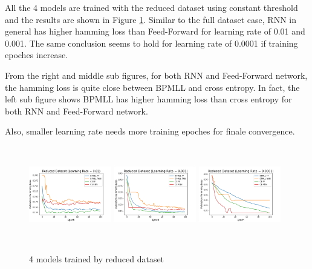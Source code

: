 \documentclass[11pt]{article}
\begin{document}
All the 4 models are trained with the reduced dataset using constant threshold and the results are shown in Figure \ref{fig:example2}. Similar to the full dataset case, RNN in general has higher hamming loss than Feed-Forward for learning rate of 0.01 and 0.001. The same conclusion seems to hold for learning rate of 0.0001 if training epoches increase. 

From the right and middle sub figures, for both RNN and Feed-Forward network, the hamming loss is quite close between BPMLL and cross entropy. In fact, the left sub figure shows BPMLL has higher hamming loss than cross entropy for both RNN and Feed-Forward network.

Also, smaller learning rate needs more training epoches for finale convergence. 

\begin{figure}[!htbp]
\centering 
        \includegraphics[width=0.32\textwidth,height=4.2cm]{Reduced_Dataset_Learning_Rate_01.png}
        \includegraphics[width=0.32\textwidth,height=4.2cm]{Reduced_Dataset_Learning_Rate_001.png}
        \includegraphics[width=0.32\textwidth,height=4.2cm]{Reduced_Dataset_Learning_Rate_0001.png}        
\caption[Original image and post processed image]{4 models trained by reduced dataset}
\label{fig:example2} 
\end{figure}
\end{document}
